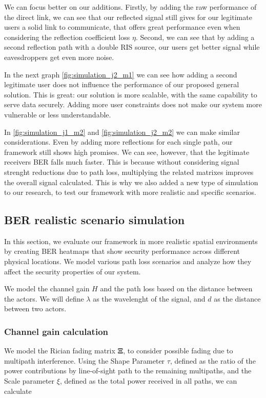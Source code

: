 We can focus better on our additions. Firstly, by adding the raw performance of the direct link, we can see that our reflected signal still gives for our legitimate users a solid link to communicate, that offers great performance even when considering the reflection coefficient loss $\eta$. Second, we can see that by adding a second reflection path with a double RIS source, our users get better signal while eavesdroppers get even more noise.

In the next graph \ref{fig:simulation_j2_m1} we can see how adding a second legitimate user does not influence the performance of our proposed general solution. This is great: our solution is more scalable, with the same capability to serve data securely. Adding more user constraints does not make our system more vulnerable or less understandable.

In \ref{fig:simulation_j1_m2} and \ref{fig:simulation_j2_m2} we can make similar considerations. Even by adding more reflections for each single path, our framework still shows high promises. We can see, however, that the legitimate receivers BER falls much faster. This is because without considering signal strenght reductions due to path loss, multiplying the related matrixes improves the overall signal calculated. This is why we also added a new type of simulation to our research, to test our framework with more realistic and specific scenarios.

\newpage
\subsection{BER realistic scenario simulation}

In this section, we evaluate our framework in more realistic spatial environments by creating BER heatmaps that show security performance across different physical locations. We model various path loss scenarios and analyze how they affect the security properties of our system.

We model the channel gain $H$ and the path loss based on the distance between the actors. We will define $\lambda$ as the wavelenght of the signal, and $d$ as the distance between two actors.

\subsubsection{Channel gain calculation}

We model the Rician fading \cite{Rician_fading} matrix $\bm{\Xi}$, to consider possible fading due to multipath interference. Using the Shape Parameter $\tau$, defined as the ratio of the power contributions by line-of-sight path to the remaining multipaths, and the Scale parameter $\xi$, defined as the total power received in all paths, we can calculate

